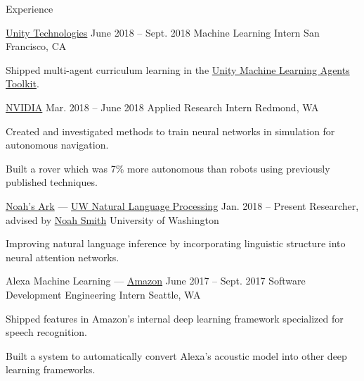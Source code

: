 \documentclass{resume}
\begin{document}
\begin{rSection}{Experience}
  \begin{rSubsection}{{\href{https://unity3d.ai/}{Unity Technologies}}}
                      {June 2018 -- Sept. 2018}
                      {Machine Learning Intern}
                      {San Francisco, CA}
    \item Shipped multi-agent curriculum learning in the
      \href{https://github.com/Unity-Technologies/ml-agents}
           {Unity Machine Learning Agents Toolkit}.
  \end{rSubsection}

  \begin{rSubsection}{{\href{http://www.nvidia.com/page/home.html}{NVIDIA}}}
                      {Mar. 2018 -- June 2018}
                      {Applied Research Intern}
                      {Redmond, WA}
    \item Created and investigated methods to train neural networks in
      simulation for autonomous navigation.
    \item Built a rover which was 7\% more autonomous than robots using
      previously published techniques.
  \end{rSubsection}

  \begin{rSubsection}{\href{http://www.ark.cs.washington.edu/}
                            {Noah's Ark} --- 
                      \href{https://nlp.washington.edu/}
                           {UW Natural Language Processing}}
                     {Jan. 2018 -- Present}
                     {Researcher, advised by
                       \href{https://homes.cs.washington.edu/~nasmith/}
                            {Noah Smith}}
                     {University of Washington}
    \item Improving natural language inference by incorporating linguistic
      structure into neural attention networks.
  \end{rSubsection}

  \begin{rSubsection}{Alexa Machine Learning ---
                       {\href{https://www.amazon.com/}{Amazon}}}
                     {June 2017 -- Sept. 2017}
                     {Software Development Engineering Intern}
                     {Seattle, WA}
    \item Shipped features in Amazon's internal deep learning framework
      specialized for speech recognition.
    \item Built a system to automatically convert Alexa's acoustic model into
      other deep learning frameworks.
  \end{rSubsection}


\end{rSection}
\end{document}
